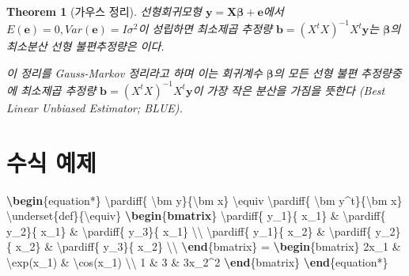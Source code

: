 \documentclass[
]{book}
\newenvironment{Shaded}{\begin{snugshade}}{\end{snugshade}}
\newcommand{\ErrorTok}[1]{\textcolor[rgb]{0.64,0.00,0.00}{\textbf{#1}}}
\newcommand{\ExtensionTok}[1]{#1}
\newcommand{\KeywordTok}[1]{\textcolor[rgb]{0.13,0.29,0.53}{\textbf{#1}}}
\newcommand{\NormalTok}[1]{#1}
\newcommand{\SpecialCharTok}[1]{\textcolor[rgb]{0.00,0.00,0.00}{#1}}
\newcommand{\SpecialStringTok}[1]{\textcolor[rgb]{0.31,0.60,0.02}{#1}}
\newtheorem{theorem}{Theorem}[chapter]
\theoremstyle{definition}
\theoremstyle{definition}
\theoremstyle{definition}
\theoremstyle{definition}
\theoremstyle{remark}
\begin{document}
\begin{theorem}[가우스 정리]
\protect\hypertarget{thm:gauss}{}{\label{thm:gauss} {} }
선형회귀모형 \(\bm y = \bm X {\bm \beta} + \bm e\)에서 \(E( \bm e)=0, Var( \bm e)=I\sigma^2\)이 성립하면 최소제곱 추정량 \(\bm b=(X^tX)^{-1}X^t \bm y\)는 \(\bm \beta\)의 최소분산 선형 불편추정량은 이다.

이 정리를 Gauss-Markov 정리라고 하며 이는 회귀계수 \(\bm \beta\)의 모든 선형 불편 추정량중에 최소제곱 추정량 \(\bm b=(X^tX)^{-1}X^t \bm y\)이 가장 작은 분산을 가짐을 뜻한다 (Best Linear Unbiased Estimator; BLUE).
\end{theorem}

\hypertarget{uxc218uxc2dd-uxc608uxc81c}{%
\section{수식 예제}\label{uxc218uxc2dd-uxc608uxc81c}}

\begin{Shaded}
\begin{Highlighting}[]
\KeywordTok{\textbackslash{}begin}\NormalTok{\{}\ExtensionTok{equation*}\NormalTok{\}}
\SpecialCharTok{\textbackslash{}pardiff}\SpecialStringTok{\{ }\SpecialCharTok{\textbackslash{}bm}\SpecialStringTok{ y\}\{}\SpecialCharTok{\textbackslash{}bm}\SpecialStringTok{ x\}  }\SpecialCharTok{\textbackslash{}equiv}\SpecialStringTok{ }\SpecialCharTok{\textbackslash{}pardiff}\SpecialStringTok{\{ }\SpecialCharTok{\textbackslash{}bm}\SpecialStringTok{ y\^{}t\}\{}\SpecialCharTok{\textbackslash{}bm}\SpecialStringTok{ x\}}
\SpecialCharTok{\textbackslash{}underset}\SpecialStringTok{\{def\}\{}\SpecialCharTok{\textbackslash{}equiv}\SpecialStringTok{\} }\KeywordTok{\textbackslash{}begin}\NormalTok{\{}\ErrorTok{bmatrix}\NormalTok{\}}
\SpecialCharTok{\textbackslash{}pardiff}\SpecialStringTok{\{  y\_1\}\{ x\_1\} \&  }\SpecialCharTok{\textbackslash{}pardiff}\SpecialStringTok{\{  y\_2\}\{ x\_1\} \&  }\SpecialCharTok{\textbackslash{}pardiff}\SpecialStringTok{\{  y\_3\}\{ x\_1\}  }\SpecialCharTok{\textbackslash{}\textbackslash{}}
\SpecialCharTok{\textbackslash{}pardiff}\SpecialStringTok{\{  y\_1\}\{ x\_2\} \&  }\SpecialCharTok{\textbackslash{}pardiff}\SpecialStringTok{\{  y\_2\}\{ x\_2\} \&  }\SpecialCharTok{\textbackslash{}pardiff}\SpecialStringTok{\{  y\_3\}\{ x\_2\}  }\SpecialCharTok{\textbackslash{}\textbackslash{}}
\KeywordTok{\textbackslash{}end}\NormalTok{\{}\ExtensionTok{bmatrix}\NormalTok{\}}
\NormalTok{=  }\KeywordTok{\textbackslash{}begin}\NormalTok{\{}\ExtensionTok{bmatrix}\NormalTok{\}}
\SpecialStringTok{2x\_1 \&  }\SpecialCharTok{\textbackslash{}exp}\SpecialStringTok{(x\_1) \& }\SpecialCharTok{\textbackslash{}cos}\SpecialStringTok{(x\_1)  }\SpecialCharTok{\textbackslash{}\textbackslash{}}
\SpecialStringTok{1 \&  3  \&  3x\_2\^{}2}
\KeywordTok{\textbackslash{}end}\NormalTok{\{}\ExtensionTok{bmatrix}\NormalTok{\}}
\KeywordTok{\textbackslash{}end}\NormalTok{\{}\ExtensionTok{equation*}\NormalTok{\}}
\end{Highlighting}
\end{Shaded}
\end{document}
